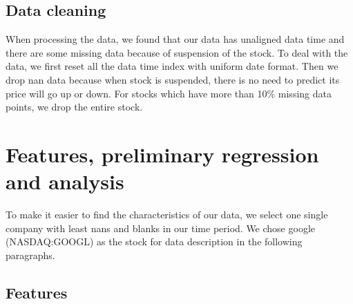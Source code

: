 \documentclass{article}
\begin{document}
\subsection{Data cleaning}
When processing the data, we found that our data has unaligned data time and there are some missing data because of suspension of the stock. To deal with the data, we first reset all the data time index with uniform date format. Then we drop nan data because when stock is suspended, there is no need to predict its price will go up or down. For stocks which have more than 10\% missing data points, we drop the entire stock.

\section{Features, preliminary regression and analysis}
To make it easier to find the characteristics of our data, we select one single company with least nans and blanks in our time period. We chose google (NASDAQ:GOOGL) as the stock for data description in the following paragraphs. 
\subsection{Features} 
\end{document}
